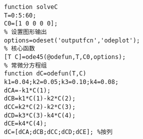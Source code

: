 \begin{solution}

\begin{lstlisting}
function solveC
T=0:5:60;
C0=[1 0 0 0 0];
% 设置图形输出
options=odeset('outputfcn','odeplot');
% 核心函数
[T C]=ode45(@odefun,T,C0,options);
% 常微分方程组
function dC=odefun(T,C)
k1=0.04;k2=0.05;k3=0.10;k4=0.08;
dCA=-k1*C(1);
dCB=k1*C(1)-k2*C(2);
dCC=k2*C(2)-k2*C(3);
dCD=k3*C(3)-k4*C(4);
dCE=k4*C(4);
dC=[dCA;dCB;dCC;dCD;dCE]; %按列
\end{lstlisting}

\end{solution}




